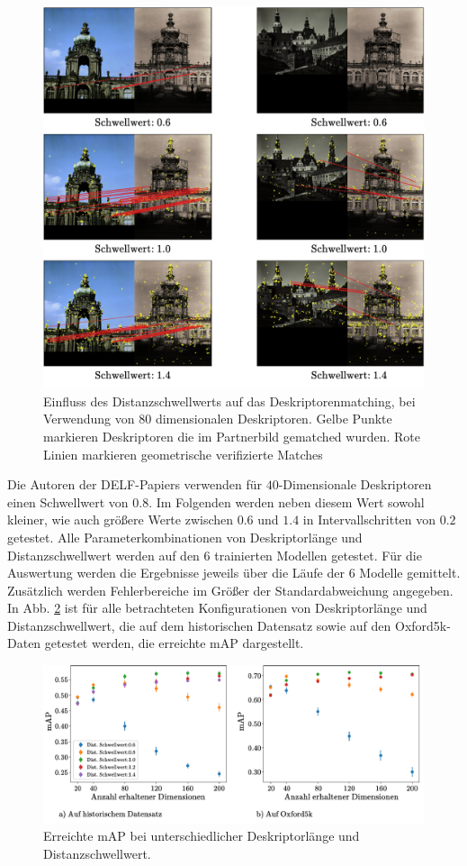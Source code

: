 \begin{figure}[H]
\centering
\includegraphics[scale=0.86]{influence_threshold}
\caption{Einfluss des Distanzschwellwerts auf das Deskriptorenmatching, bei Verwendung von $80$ dimensionalen Deskriptoren. Gelbe Punkte markieren Deskriptoren die im Partnerbild gematched wurden. Rote Linien markieren geometrische verifizierte Matches}
\label{influence_threshold}
\end{figure}

Die Autoren der DELF-Papiers \cite{delf} verwenden für $40$-Dimensionale Deskriptoren einen Schwellwert von $0.8$. 
Im Folgenden werden neben diesem Wert sowohl kleiner, wie auch größere Werte zwischen $0.6$ und $1.4$ in Intervallschritten von $0.2$ getestet. Alle Parameterkombinationen von Deskriptorlänge und Distanzschwellwert werden auf den $6$ trainierten Modellen getestet. Für die Auswertung werden die Ergebnisse jeweils über die Läufe der $6$ Modelle gemittelt. Zusätzlich werden Fehlerbereiche im Größer der Standardabweichung angegeben. In Abb. \ref{mAP_num_dim} ist für alle betrachteten Konfigurationen von Deskriptorlänge und Distanzschwellwert, die auf dem historischen Datensatz sowie auf den Oxford5k-Daten getestet werden, die erreichte mAP dargestellt.

\begin{figure}[h]
\includegraphics[scale=0.74]{mAp_num_dim}
\caption{Erreichte mAP bei unterschiedlicher Deskriptorlänge und Distanzschwellwert.}
\label{mAP_num_dim}
\end{figure}

